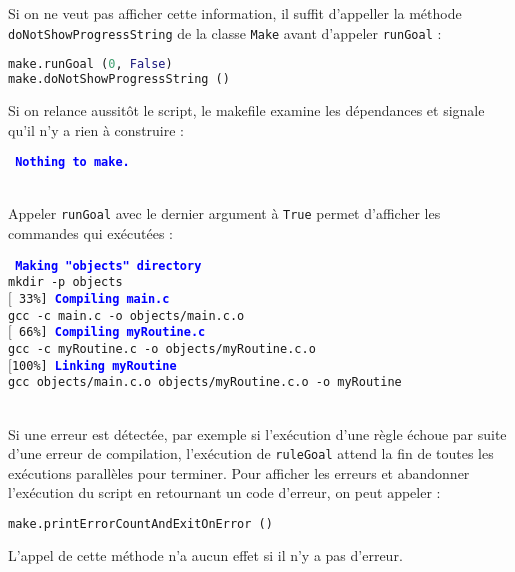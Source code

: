 \documentclass[a4paper,11pt]{extarticle}
\begin{document}
Si on ne veut pas afficher cette information, il suffit d'appeller la méthode \texttt{doNotShowProgressString} de la classe \texttt{Make} avant d'appeler \texttt{runGoal} :

\begin{lstlisting}[language=py]
make.runGoal (0, False)
make.doNotShowProgressString ()
\end{lstlisting}





Si on relance aussitôt le script, le makefile examine les dépendances et signale qu'il n'y a rien à construire :

\begin{mdframed}[hidealllines=true,backgroundcolor=lightgray!20]
\tt\footnotesize
\textcolor{blue}{\bf Nothing to make.}
\end{mdframed}



~\\Appeler \texttt{runGoal} avec le dernier argument à \texttt{True} permet d'afficher les commandes qui exécutées :

\begin{mdframed}[hidealllines=true,backgroundcolor=lightgray!20]
\tt\footnotesize
\textcolor{blue}{\bf Making "objects" directory}\\
mkdir -p objects\\
$[$~33\%]~\textcolor{blue}{\bf Compiling main.c}\\
gcc -c main.c -o objects/main.c.o\\
$[$~66\%]~\textcolor{blue}{\bf Compiling myRoutine.c}\\
gcc -c myRoutine.c -o objects/myRoutine.c.o\\
$[$100\%]~\textcolor{blue}{\bf Linking myRoutine}\\
gcc objects/main.c.o objects/myRoutine.c.o -o myRoutine
\end{mdframed}

~\\Si une erreur est détectée, par exemple si l'exécution d'une règle échoue par suite d'une erreur de compilation, l'exécution de \texttt{ruleGoal} attend la fin de toutes les exécutions parallèles pour terminer. Pour afficher les erreurs et abandonner l'exécution du script en retournant un code d'erreur, on peut appeler :
\begin{lstlisting}[language=py]
make.printErrorCountAndExitOnError ()
\end{lstlisting}
L'appel de cette méthode n'a aucun effet si il n'y a pas d'erreur.
\end{document}

